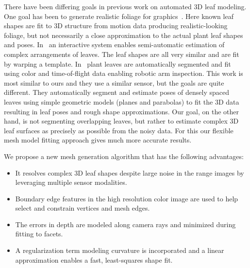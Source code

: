 There have been differing goals in previous work on automated $3$D leaf modeling.   One goal has been to generate realistic foliage for graphics~\cite{Bradley:2013}.  Here known leaf shapes are fit to $3$D structure from motion data producing realistic-looking foliage, but not necessarily a close approximation to the actual plant leaf shapes and poses.  In~\cite{Quan:2006} an interactive system enables semi-automatic estimation of complex arrangements of leaves.  The leaf shapes are all very similar and are fit by warping a template.  In~\cite{Alenya2011,Alenya2013} plant leaves are automatically segmented and fit using color and time-of-flight data enabling robotic arm inspection.  This work is most similar to ours and they use a similar sensor, but the goals are quite different.  They automatically segment and estimate poses of densely spaced leaves using simple geometric models (planes and parabolas) to fit the 3D data resulting in leaf poses and rough shape approximations.  Our goal, on the other hand, is not segmenting overlapping leaves, but rather to estimate complex $3$D leaf surfaces as precisely as possible from the noisy data.  For this our flexible mesh model fitting approach gives much more accurate results.


We propose a new mesh generation algorithm that has the following advantages:
\begin{itemize}
\item It resolves complex $3$D leaf shapes despite large noise in the range images by leveraging multiple sensor modalities.  
\item Boundary edge features in the high resolution color image are used to help select and constrain vertices and mesh edges.  
\item The errors in depth are modeled along camera rays and minimized during fitting to facets.  
\item A regularization term modeling curvature is incorporated and a linear approximation enables a fast, least-squares shape fit.
\end{itemize}



